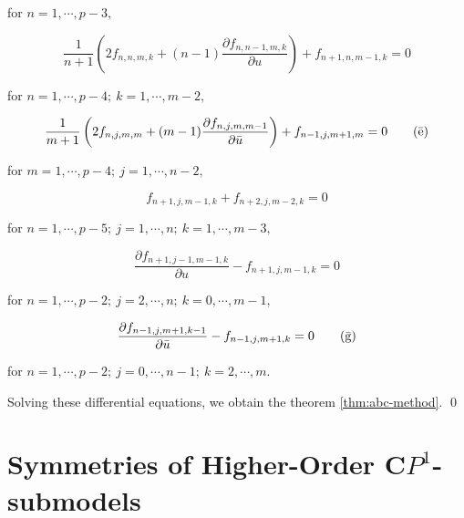 \documentclass[makeidx,12pt,openany]{report}
\begin{document}
\begin{flushright}
 for \quad $n=1,\cdots,p-3,$ \hspace*{1cm}
\end{flushright}
\begin{equation}
 \frac{1}{n+1}\left( 2f_{n,n,m,k}+(n-1)
  \frac{\partial f_{n,n-1,m,k}}{\partial u} \right) +
 f_{n+1,n,m-1,k}=0 \tag{e}
\end{equation}
\begin{flushright}
 for \quad $n=1,\cdots,p-4; \ k=1,\cdots,m-2,$ \hspace*{1cm}
\end{flushright}
\begin{equation}
 \frac{1}{m+1}\left( 2f_{n,j,m,m}+(m-1)
  \frac{\partial f_{n,j,m,m-1}}{\partial \bar{u}} \right) +
 f_{n-1,j,m+1,m}=0 \tag{$\bar{\mbox{e}}$}
\end{equation}
\begin{flushright}
 for \quad $m=1,\cdots,p-4; \ j=1,\cdots,n-2,$ \hspace*{1cm}
\end{flushright}
\begin{equation}
 f_{n+1,j,m-1,k}+f_{n+2,j,m-2,k}=0 \tag{f}
\end{equation}
\begin{flushright}
 for \quad $n=1,\cdots,p-5; \ 
            j=1,\cdots,n; \ k=1,\cdots,m-3,$ \hspace*{1cm}
\end{flushright}
\begin{equation}
  \frac{\partial f_{n+1,j-1,m-1,k}}{\partial u}-
 f_{n+1,j,m-1,k}=0 \tag{g}
\end{equation}
\begin{flushright}
 for \quad $n=1,\cdots,p-2; \ 
            j=2,\cdots,n; \ k=0,\cdots,m-1,$ \hspace*{1cm}
\end{flushright}
\begin{equation}
  \frac{\partial f_{n-1,j,m+1,k-1}}{\partial \bar{u}}-
 f_{n-1,j,m+1,k}=0 \tag{$\bar{\mbox{g}}$}
\end{equation}
\begin{flushright}
 for \quad $n=1,\cdots,p-2; \ 
            j=0,\cdots,n-1; \ k=2,\cdots,m.$ \hspace*{1cm}
\end{flushright}
Solving these differential equations, 
we obtain the theorem \ref{thm:abc-method}. \qed
\section{Symmetries of Higher-Order ${\mathbf{C}}P^1$-submodels}
\end{document}
